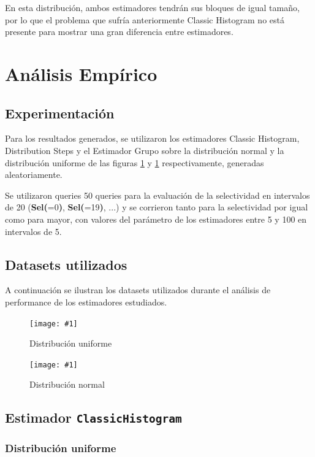 \documentclass[a4paper, 10pt, twoside]{article}
\newcommand{\grafico}[3]{
  \begin{figure}[H]
    \texttt{[image: \#1]}
    \caption{#2}
    \label{#3}
  \end{figure}
}
\begin{document}
En esta distribución, ambos estimadores tendrán sus bloques de igual tamaño, por lo que el problema que sufría anteriormente Classic Histogram no está presente para mostrar una gran diferencia entre estimadores.




\section{Análisis Empírico}

\subsection{Experimentación}
Para los resultados generados, se utilizaron los estimadores Classic Histogram, Distribution Steps y el Estimador Grupo 
sobre la distribución normal y la distribución uniforme de las figuras \ref{custom-dataset-uniform} y 
\ref{custom-dataset-uniform} respectivamente, generadas aleatoriamente. 

Se utilizaron queries 50 queries para la evaluación de la selectividad en intervalos de 20 (\textbf{Sel(}=0\textbf{)}, \textbf{Sel(}=19\textbf{)}, ...) y se corrieron tanto para la selectividad por igual como para mayor, con valores del 
parámetro de los estimadores entre 5 y 100 en intervalos de 5.



\subsection{Datasets utilizados}

A continuación se ilustran los datasets utilizados durante el análisis de performance de los estimadores estudiados.

\grafico{custom-dataset-uniform}
        {Distribución uniforme}
        {custom-dataset-uniform}

\grafico{custom-dataset-normal}
        {Distribución normal}
        {custom-dataset-normal}


\subsection{Estimador \texttt{ClassicHistogram}}

\subsubsection{Distribución uniforme}
\end{document}
